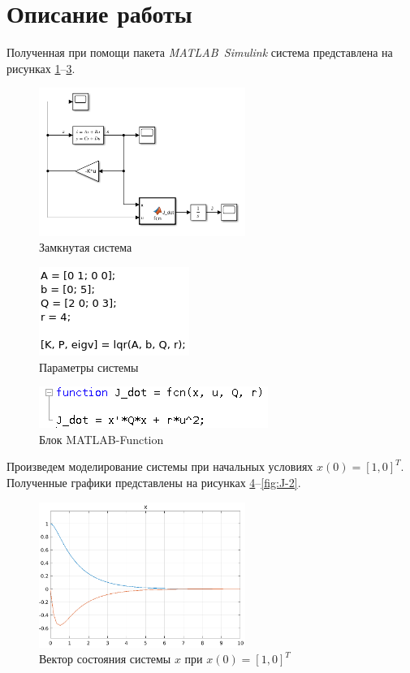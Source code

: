 \documentclass[14pt, a4paper]{extarticle}
\begin{document}
	\newpage
	
	\section*{Описание работы}
	
	Полученная при помощи пакета \textit{MATLAB~Simulink} система представлена на рисунках \ref{fig:system}--\ref{fig:MATLAB-Function}.
	
	\begin{figure}[h]
		\centering
		\includegraphics[width=0.6\textwidth]{system}
		\caption{Замкнутая система}
		\label{fig:system}
	\end{figure}

	\begin{figure}[h]
		\centering
		\includegraphics{properties}
		\caption{Параметры системы}
		\label{fig:properties}
	\end{figure}

	\begin{figure}[H]
		\centering
		\includegraphics{MATLAB-Function}
		\caption{Блок MATLAB-Function}
		\label{fig:MATLAB-Function}
	\end{figure}

	Произведем моделирование системы при начальных условиях $x(0)=[1,0]^T$. Полученные графики представлены на рисунках \ref{fig:x-2}--\ref{fig:J-2}.

	\begin{figure}[h]
		\centering
		\includegraphics[width=0.6\textwidth]{x-2}
		\caption{Вектор состояния системы $x$ при $x(0)=[1,0]^T$}
		\label{fig:x-2}
	\end{figure}
\end{document}
